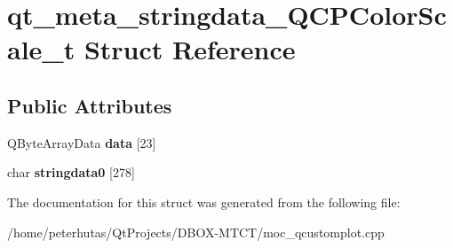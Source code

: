 \hypertarget{structqt__meta__stringdata___q_c_p_color_scale__t}{}\section{qt\+\_\+meta\+\_\+stringdata\+\_\+\+Q\+C\+P\+Color\+Scale\+\_\+t Struct Reference}
\label{structqt__meta__stringdata___q_c_p_color_scale__t}
\subsection*{Public Attributes}
\begin{DoxyCompactItemize}
\item 
\mbox{\label{structqt__meta__stringdata___q_c_p_color_scale__t_adbfbd7275c982d9d6c70985a35909562}} 
Q\+Byte\+Array\+Data {\bfseries data} \mbox{[}23\mbox{]}
\item 
\mbox{\label{structqt__meta__stringdata___q_c_p_color_scale__t_a0ed4cd437d62f56ea375637ec624a59c}} 
char {\bfseries stringdata0} \mbox{[}278\mbox{]}
\end{DoxyCompactItemize}


The documentation for this struct was generated from the following file\+:\begin{DoxyCompactItemize}
\item 
/home/peterhutas/\+Qt\+Projects/\+D\+B\+O\+X-\/\+M\+T\+C\+T/moc\+\_\+qcustomplot.\+cpp\end{DoxyCompactItemize}
